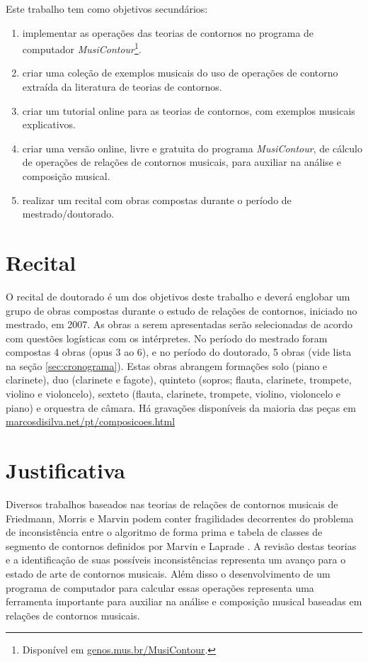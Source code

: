 \documentclass[12pt]{article}
\newcommand{\eng}[1]{\textit{#1}}
\begin{document}
Este trabalho tem como objetivos secundários:

\begin{enumerate}
\item implementar as operações das teorias de contornos no programa de
  computador \eng{MusiContour}\footnote{Disponível em
    \url{genos.mus.br/MusiContour}.}.
\item criar uma coleção de exemplos musicais do uso de operações de
  contorno extraída da literatura de teorias de contornos.
\item criar um tutorial online para as teorias de contornos, com
  exemplos musicais explicativos.
\item criar uma versão online, livre e gratuita do programa
  \eng{MusiContour}, de cálculo de operações de relações de contornos
  musicais, para auxiliar na análise e composição musical.
\item realizar um recital com obras compostas durante o período de
  mestrado/doutorado.
\end{enumerate}

\section{Recital}
\label{sec:recital}

O recital de doutorado é um dos objetivos deste trabalho e deverá
englobar um grupo de obras compostas durante o estudo de relações de
contornos, iniciado no mestrado, em 2007. As obras a serem
apresentadas serão selecionadas de acordo com questões logísticas com
os intérpretes. No período do mestrado foram compostas 4 obras (opus 3
ao 6), e no período do doutorado, 5 obras (vide lista na seção
\ref{sec:cronograma}). Estas obras abrangem formações solo (piano e
clarinete), duo (clarinete e fagote), quinteto (sopros; flauta,
clarinete, trompete, violino e violoncelo), sexteto (flauta,
clarinete, trompete, violino, violoncelo e piano) e orquestra de
câmara. Há gravações disponíveis da maioria das peças em
\url{marcosdisilva.net/pt/composicoes.html}

\section{Justificativa}
\label{sec:justificativa}

Diversos trabalhos baseados nas teorias de relações de contornos
musicais de Friedmann, Morris e Marvin podem conter fragilidades
decorrentes do problema de inconsistência entre o algoritmo de forma
prima e tabela de classes de segmento de contornos definidos por
Marvin e Laprade \cite{marvin.ea87:relating}. A revisão destas teorias
e a identificação de suas possíveis inconsistências representa um
avanço para o estado de arte de contornos musicais. Além disso o
desenvolvimento de um programa de computador para calcular essas
operações representa uma ferramenta importante para auxiliar na
análise e composição musical baseadas em relações de contornos
musicais.
\end{document}
